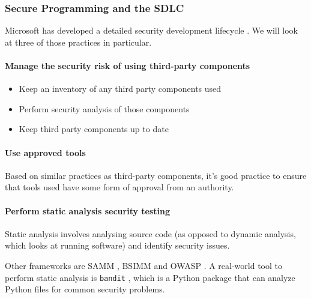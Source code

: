 
\subsubsection{Secure Programming and the SDLC} %
\label{sub:secure_programming_and_the_sdlc}
Microsoft has developed a detailed security development lifecycle \cite{microsoft}. We will look at three of those practices in particular.

\paragraph{Manage the security risk of using third-party components} %
\label{par:manage_the_security_risk_of_using_third_party_components}
\begin{itemize}
	\item Keep an inventory of any third party components used
	\item Perform security analysis of those components 
	\item Keep third party components up to date
\end{itemize}


\paragraph{Use approved tools} %
\label{par:use_approved_tools}
Based on similar practices as third-party components, it's good practice to ensure that tools used have some form of approval from an authority.


\paragraph{Perform static analysis security testing} %
\label{par:perform_static_analysis_security_testing}
Static analysis involves analysing source code (as opposed to dynamic analysis, which looks at running software) and identify security issues.

Other frameworks are SAMM \cite{SAMM}, BSIMM \cite{BSIMM} and OWASP \cite{OWASP}. A real-world tool to perform static analysis is \texttt{bandit} \cite{bandit}, which is a Python package that can analyze Python files for common security problems.

